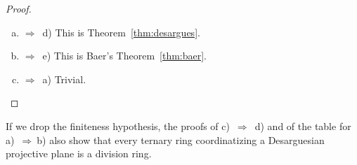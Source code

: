 \begin{proof}
\begin{enumerate}[a)]
        \vspace{-\parskip}
        {\footnotesize
        $$
            \begin{aligned}
                (x,y)\incidence{[m,b]}
                    &\iff m\cdot x\+(\dotminus1)\cdot y\+b=0
                    \iff[x:y:1]\incidence(m:\dotminus1:b),\\
                (x,y)\incidence{[a]}
                    &\iff x=a
                    \iff[x:y:1]\incidence(1:0:\dotminus a),\\
                (x,y)\incidence{[\infty]}
                    &\iff\textsc{ false}
                    \iff[x:y:1]\incidence(0:0:1),\\
                (s)\incidence{[m,b]}
                    &\iff s=m
                    \iff[1:s:0]\incidence(m:\dotminus1:b),\\
                (s)\incidence{[a]}
                    &\iff\textsc{ false}
                    \iff[1:s:0]\incidence(1:0:\dotminus a),\\
                (s)\incidence{[\infty]}
                    &\iff\textsc{ true}
                    \iff[1:s:0]\incidence(0:0:1),\\
                (\infty)\incidence{[m,b]}
                    &\iff\textsc{ false}
                    \iff[0:1:0]\incidence(m:\dotminus1:b),\\
                (\infty)\incidence{[a]}
                    &\iff\textsc{ true}
                    \iff[0:1:0]\incidence(1:0:\dotminus a),\\
                (\infty)\incidence{[\infty]}
                    &\iff\textsc{ true}
                    \iff[0:1:0]\incidence(0:0:1).
            \end{aligned}
        $$}

        \item$\Rightarrow$~d) This is Theorem~\ref{thm:desargues}.

        \item$\Rightarrow$~e) This is Baer's Theorem~\ref{thm:baer}.

        \item$\Rightarrow$~a) Trivial.        
    \end{enumerate}
\end{proof}

\begin{rem}\label{rem:desarguess-implies-division-ring}
    If we drop the finiteness hypothesis, the proofs of c)~$\Rightarrow$~d) and of the table for a)~$\Rightarrow~$b) also show that every ternary ring coordinatizing a Desarguesian projective plane is a division ring.
\end{rem}


